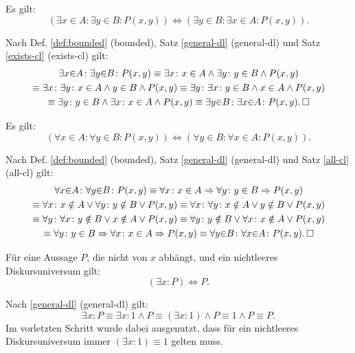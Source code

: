 \begin{Satz}\label{bounded-exists-cl}
Es gilt:
\[(\exists x{\in}A\colon \exists y{\in}B\colon P(x,y))
\iff (\exists y{\in}B\colon \exists x{\in}A\colon P(x,y)).\]
\end{Satz}

\begin{Beweis} Nach Def. \ref{def:bounded} (bounded),
Satz \ref{general-dl} (general-dl)
und Satz \ref{exists-cl} (exists-cl) gilt:
\begin{gather*}
\exists x{\in}A\colon \exists y{\in}B\colon P(x,y)
\equiv \exists x\colon x\in A\land\exists y\colon y\in B\land P(x,y)\\
\equiv \exists x\colon \exists y\colon x\in A\land y\in B\land P(x,y)
\equiv \exists y\colon \exists x\colon y\in B\land x\in A\land P(x,y)\\
\equiv \exists y\colon y\in B\land \exists x\colon x\in A\land P(x,y)
\equiv \exists y{\in}B\colon\exists x{\in}A\colon P(x,y).\,\square
\end{gather*}
\end{Beweis}

\begin{Satz}\label{bounded-all-cl}
Es gilt:
\[(\forall x{\in}A\colon \forall y{\in}B\colon P(x,y))
\iff (\forall y{\in}B\colon \forall x{\in}A\colon P(x,y)).\]
\end{Satz}
\begin{Beweis}\newlinefirst
Nach Def. \ref{def:bounded} (bounded),
Satz \ref{general-dl} (general-dl)
und Satz \ref{all-cl} (all-cl) gilt:
\begin{gather*}
\forall x{\in}A\colon \forall y{\in}B\colon P(x,y)
\equiv \forall x\colon x\in A\Rightarrow \forall y\colon y\in B\Rightarrow P(x,y)\\
\equiv \forall x\colon x\notin A\lor \forall y\colon y\notin B\lor P(x,y)
\equiv \forall x\colon \forall y\colon x\notin A\lor y\notin B\lor P(x,y)\\
\equiv \forall y\colon \forall x\colon y\notin B\lor x\notin A\lor P(x,y)
\equiv \forall y\colon y\notin B\lor \forall x\colon x\notin A\lor P(x,y)\\
\equiv \forall y\colon y\in B\Rightarrow \forall x\colon x\in A\Rightarrow P(x,y)
\equiv \forall y{\in}B\colon\forall x{\in}A\colon P(x,y).\,\square
\end{gather*}
\end{Beweis}

\begin{Satz}
Für eine Aussage $P$, die nicht von $x$ abhängt, und ein nichtleeres
Diskursuniversum gilt:
\[(\exists x\colon P) \iff P.\]
\end{Satz}
\begin{Beweis}[Beweis]
Nach \ref{general-dl} (general-dl) gilt:
\[\exists x\colon P \equiv \exists x\colon 1\land P
\equiv (\exists x\colon 1)\land P\equiv 1\land P\equiv P.\]
Im vorletzten Schritt wurde dabei ausgenutzt, dass
für ein nichtleeres Diskursuniversum immer $(\exists x\colon 1)\equiv 1$
gelten muss.\,\qedsymbol
\end{Beweis}

